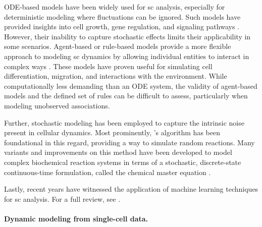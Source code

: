 \acrshort{ODE}-based models have been widely used for \acrlong{sc} analysis, especially for deterministic modeling where fluctuations can be ignored. Such models have provided insights into cell growth, gene regulation, and signaling pathways \citep{busch2015fundamental, raue2015data2dynamics, tyson2003sniffers, alon2019introduction}. However, their inability to capture stochastic effects limits their applicability in some scenarios.
Agent-based or rule-based models provide a more flexible approach to modeling \acrlong{sc} dynamics by allowing individual entities to interact in complex ways \citep{an2009agent}. These models have proven useful for simulating cell differentiation, migration, and interactions with the environment. While computationally less demanding than an ODE system, the validity of agent-based models and the defined set of rules can be difficult to assess, particularly when modeling unobserved associations.

Further, stochastic modeling has been employed to capture the intrinsic noise present in cellular dynamics. Most prominently, \citeauthor{gillespie1977exact}'s algorithm \citep{gillespie1977exact} has been foundational in this regard, providing a way to simulate random reactions. Many variants and improvements on this method have been developed to model complex biochemical reaction systems \citep{gibson2000efficient} in terms of a stochastic, discrete-state continuous-time formulation, called the chemical master equation \citep{liang2010computational}.

Lastly, recent years have witnessed the application of machine learning techniques for \acrlong{sc} analysis. For a full review, see \citet{oh2021temporal}.

\paragraph{Dynamic modeling from single-cell data.}

